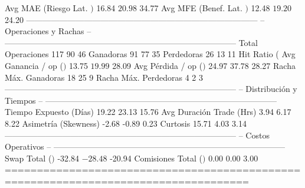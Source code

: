   Avg MAE (Riesgo Lat. $)     $          16.84  $          20.98  $          34.77
  Avg MFE (Benef. Lat. $)     $          12.48  $          19.20  $          24.20
------------------------------------------------------------------------------------
  -- Operaciones y Rachas --
------------------------------------------------------------------------------------
  Total Operaciones                        117                90                46
  Ganadoras                                 91                77                35
  Perdedoras                                26                13                11
  Hit Ratio (%
  Avg Ganancia / op ($)       $          13.75  $          19.99  $          28.09
  Avg Pérdida / op ($)        $          24.97  $          37.78  $          28.27
  Racha Máx. Ganadoras                      18                25                 9
  Racha Máx. Perdedoras                      4                 2                 3
------------------------------------------------------------------------------------
  -- Distribución y Tiempos --
------------------------------------------------------------------------------------
  Tiempo Expuesto (Días)                 19.22             23.13             15.76
  Avg Duración Trade (Hrs)                3.94              6.17              8.22
  Asimetría (Skewness)                   -2.68             -0.89              0.23
  Curtosis                               15.71              4.03              3.14
------------------------------------------------------------------------------------
  -- Costos Operativos --
------------------------------------------------------------------------------------
  Swap Total ($)              $         -32.84  $         -28.48  $         -20.94
  Comisiones Total ($)        $           0.00  $           0.00  $           3.00
====================================================================================


